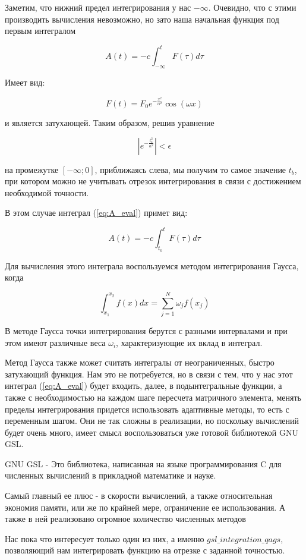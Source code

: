 \documentclass[14pt]{extarticle}
\begin{document}
Заметим, что нижний предел интегрирования у нас $-\infty$. Очевидно, что с этими производить вычисления невозможно, но зато наша начальная функция под первым интегралом

$$
A(t) = -c\int_{-\infty}^{t} F(\tau) d\tau
$$

Имеет вид:

\begin{equation}\label{eq:A_eval}
F(t) =  F_0 e^{ -\frac{x^2}{\alpha^2} }  \cos(\omega x)
\end{equation}

и является затухающей. Таким образом, решив уравнение 

$$
|e^{ -\frac{t_b^2}{\alpha^2} }| < \epsilon
$$

на промежутке $[-\infty; 0]$, приближаясь слева, мы получим то самое значение $t_b$, при котором можно не учитывать отрезок интегрирования в связи с достижением необходимой точности.

В этом случае интеграл (\ref{eq:A_eval}) примет вид:

$$\label{eq:easy}
A(t) = -c\int_{t_b}^{t} F(\tau) d\tau
$$

Для вычисления этого интеграла воспользуемся методом интегрирования Гаусса, когда 

$$
\int_{x_1}^{x_2} f(x) dx = \sum_{j=1}^{N} \omega_j f(x_j)
$$

В методе Гаусса точки интегрирования берутся с разными интервалами и при этом имеют различные веса $\omega_i$, характеризующие их вклад в интеграл.

Метод Гаусса также может считать интегралы от неограниченных, быстро затухающий функция. Нам это не потребуется, но в связи с тем, что у нас этот интеграл (\ref{eq:A_eval}) будет входить, далее, в подынтегральные функции, а также с необходимостью на каждом шаге пересчета матричного элемента, менять пределы интегрирования придется использовать адаптивные методы, то есть с переменным шагом. Они не так сложны в реализации, но поскольку вычислений будет очень много, имеет смысл воспользоваться уже готовой библиотекой GNU GSL. 

GNU GSL - Это библиотека, написанная на языке программирования C для численных вычислений в прикладной математике и науке.

Самый главный ее плюс - в скорости вычислений, а также относительная экономия памяти, или же по крайней мере, ограничение ее использования. А также в ней реализовано огромное количество численных методов

Нас пока что интересует только один из них, а именно $gsl\_integration\_qags$, позволяющий нам интегрировать функцию на отрезке с заданной точностью. 
\end{document}
